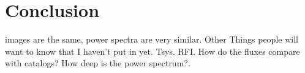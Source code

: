 \section{Conclusion}
images are the same, power spectra are very similar.
Other Things people will want to know that I haven't put in yet. Tsys. RFI. How do the fluxes compare with catalogs? How deep is the power spectrum?.